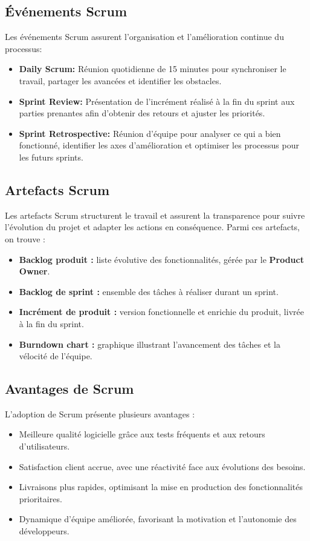 \subsection{Événements Scrum\cite{Scrum}}
    Les événements Scrum assurent l’organisation et l’amélioration continue du processus:
    \begin{itemize}[label=$\bullet$]
        \item \textbf{Daily Scrum:} Réunion quotidienne de 15 minutes pour synchroniser le travail, partager les avancées et identifier les obstacles.
        \item \textbf{Sprint Review:} Présentation de l’incrément réalisé à la fin du sprint aux parties prenantes afin d'obtenir des retours et ajuster les priorités.
        \item \textbf{Sprint Retrospective:} Réunion d’équipe pour analyser ce qui a bien fonctionné, identifier les axes d’amélioration et optimiser les processus pour les futurs sprints.
    \end{itemize}
\subsection{Artefacts Scrum\cite{Scrum}}
    Les artefacts Scrum structurent le travail et assurent la transparence pour suivre l'évolution du projet et adapter les actions en conséquence. Parmi ces artefacts, on trouve :
    \begin{itemize}[label=$\bullet$]
        \item \textbf{Backlog produit :} liste évolutive des fonctionnalités, gérée par le \textbf{Product Owner}.
        \item \textbf{Backlog de sprint :} ensemble des tâches à réaliser durant un sprint.
        \item \textbf{Incrément de produit :} version fonctionnelle et enrichie du produit, livrée à la fin du sprint.
        \item \textbf{Burndown chart :} graphique illustrant l'avancement des tâches et la vélocité de l’équipe.
    \end{itemize}
\subsection{Avantages de Scrum\cite{Scrum}}
L’adoption de Scrum présente plusieurs avantages :
\begin{itemize}[label=$\bullet$]
    \item Meilleure qualité logicielle grâce aux tests fréquents et aux retours d’utilisateurs.
    \item Satisfaction client accrue, avec une réactivité face aux évolutions des besoins.
    \item Livraisons plus rapides, optimisant la mise en production des fonctionnalités prioritaires.
    \item Dynamique d’équipe améliorée, favorisant la motivation et l’autonomie des développeurs.
\end{itemize}